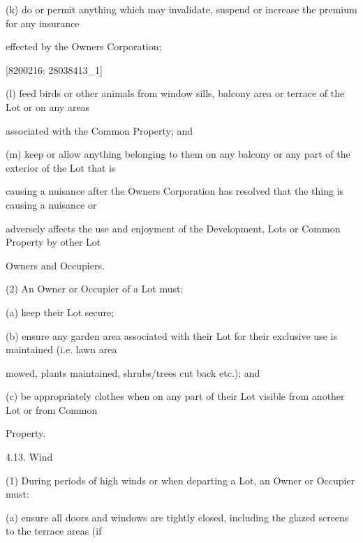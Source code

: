 \documentclass{article}
\begin{document}
{\fontsize{9.962}{1}(k) do or permit anything which may invalidate, suspend or increase the premium for any insurance }

{\fontsize{10.02}{1}effected by the Owners Corporation; }

\newpage
















{\fontsize{7.02}{1}[8200216: 28038413\_1] }

{\fontsize{9.962}{1}(l) feed birds or other animals from window sills, balcony area or terrace of the Lot or on any areas }

{\fontsize{10.02}{1}associated with the Common Property; and }

{\fontsize{9.962}{1}(m) keep or allow anything belonging to them on any balcony or any part of the exterior of the Lot that is }

{\fontsize{10.02}{1}causing a nuisance after the Owners Corporation has resolved that the thing is causing a nuisance or }

{\fontsize{10.02}{1}adversely affects the use and enjoyment of the Development, Lots or Common Property by other Lot }

{\fontsize{10.02}{1}Owners and Occupiers. }

{\fontsize{9.962}{1}(2) An Owner or Occupier of a Lot must: }

{\fontsize{9.962}{1}(a) keep their Lot secure; }

{\fontsize{9.962}{1}(b) ensure any garden area associated with their Lot for their exclusive use is maintained (i.e. lawn area }

{\fontsize{10.02}{1}mowed, plants maintained, shrubs/trees cut back etc.); and }

{\fontsize{9.962}{1}(c) be appropriately clothes when on any part of their Lot visible from another Lot or from Common }

{\fontsize{10.02}{1}Property. }

{\fontsize{9.99}{1}4.13. Wind }

{\fontsize{9.962}{1}(1) During periods of high winds or when departing a Lot, an Owner or Occupier must: }

{\fontsize{9.962}{1}(a) ensure all doors and windows are tightly closed, including the glazed screens to the terrace areas (if }
\end{document}
